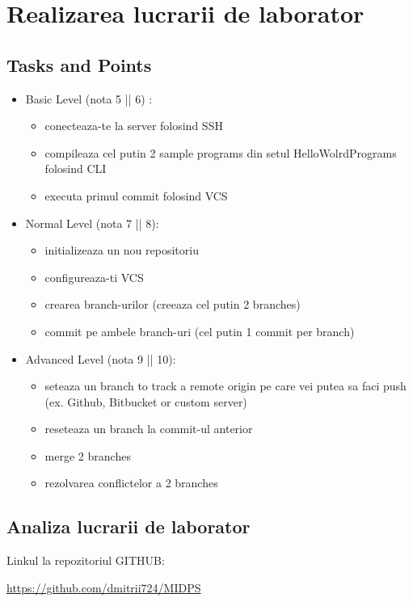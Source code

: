 \section{Realizarea lucrarii de laborator}

\subsection{Tasks and Points}

\begin{itemize}
\item Basic Level (nota 5 || 6) : 
\begin{itemize}

    \item conecteaza-te la server folosind SSH
    \item compileaza cel putin 2 sample programs din setul HelloWolrdPrograms folosind CLI
    \item executa primul commit folosind VCS

\end{itemize}
\item Normal Level (nota 7 || 8):
\begin{itemize}

   \item initializeaza un nou repositoriu
   \item configureaza-ti VCS
   \item crearea branch-urilor (creeaza cel putin 2 branches)
   \item commit pe ambele branch-uri (cel putin 1 commit per branch)

\end{itemize}
\item Advanced Level (nota 9 || 10): 
\begin{itemize}

   \item seteaza un branch to track a remote origin pe care vei putea sa faci push (ex. Github, Bitbucket or custom server)
   \item reseteaza un branch la commit-ul anterior
   \item merge 2 branches
   \item rezolvarea conflictelor a 2 branches

\end{itemize}
\end{itemize}

\subsection{Analiza lucrarii de laborator}
Linkul la repozitoriul GITHUB:
\begin{center}
\url{https://github.com/dmitrii724/MIDPS}
\end{center}

